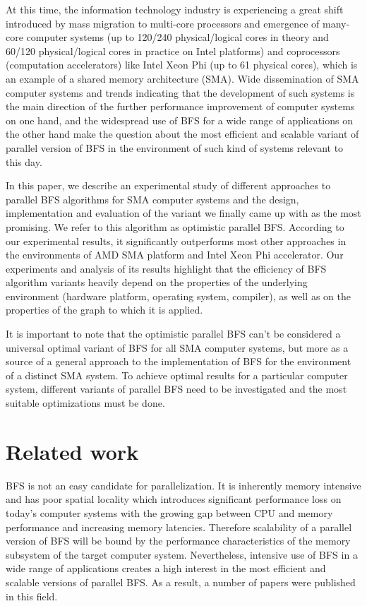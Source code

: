 \documentclass[letterpaper]{article}
\begin{document}
		At this time, the information technology industry is experiencing a great shift introduced by mass migration to multi-core processors and  emergence of many-core computer systems (up to 120/240 physical/logical cores in theory and 60/120 physical/logical cores in practice on Intel platforms) and coprocessors (computation accelerators) like Intel Xeon Phi (up to 61 physical cores), which is an example of a shared memory architecture (SMA).
		Wide dissemination of SMA computer systems and trends indicating that the development of such systems is the main direction of the further performance improvement of computer systems on one hand, and the widespread use of BFS for a wide range of applications on the other hand make the question about the most efficient and scalable variant of parallel version of BFS in the environment of such kind of systems relevant to this day.
				
		In this paper, we describe an experimental study of different approaches to parallel BFS algorithms for SMA computer systems and the design, implementation and evaluation of the variant we finally came up with as the most promising.
		We refer to this algorithm as optimistic parallel BFS.
		According to our experimental results, it significantly outperforms most other approaches in the environments of AMD SMA platform and Intel Xeon Phi accelerator.
		Our experiments and analysis of its results highlight that the efficiency of BFS algorithm variants heavily depend on the properties of the underlying environment (hardware platform, operating system, compiler), as well as on the properties of the graph to which it is applied. 
		
		It is important to note that the optimistic parallel BFS can't be considered a universal optimal variant of BFS for all SMA computer systems, but more as a source of a general approach to the implementation of BFS for the environment of a distinct SMA system.
		To achieve optimal results for a particular computer system, different variants of parallel BFS need to be investigated and the most suitable optimizations must be done.

	\section{Related work} \label{sec:rewo} %
		BFS is not an easy candidate for parallelization.
		It is inherently memory intensive and has poor spatial locality which introduces significant performance loss on today's computer systems with the growing gap between CPU and memory performance and increasing memory latencies.
		Therefore scalability of a parallel version of BFS will be bound by the performance characteristics of the memory subsystem of the target computer system. 
		Nevertheless, intensive use of BFS in a wide range of applications creates a high interest in the most efficient and scalable versions of parallel BFS.
		As a result, a number of papers were published in this field. 
		
\end{document}
